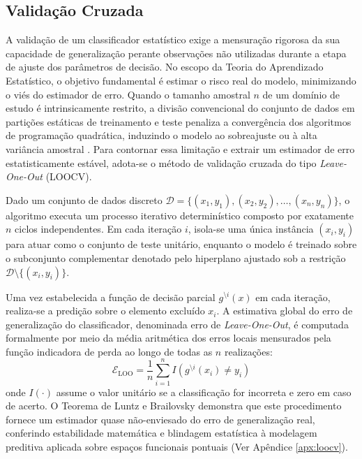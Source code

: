 \documentclass[12pt, a4paper]{article}
\theoremstyle{plain}
\theoremstyle{definition}
\theoremstyle{remark}
\newcommand{\ident}{\hspace{2em}}
\begin{document}
\subsection{Validação Cruzada}

\ident A validação de um classificador estatístico exige a mensuração rigorosa da sua capacidade de generalização perante observações não utilizadas durante a etapa de ajuste dos parâmetros de decisão. No escopo da Teoria do Aprendizado Estatístico, o objetivo fundamental é estimar o risco real do modelo, minimizando o viés do estimador de erro. Quando o tamanho amostral $n$ de um domínio de estudo é intrinsicamente restrito, a divisão convencional do conjunto de dados em partições estáticas de treinamento e teste penaliza a convergência dos algoritmos de programação quadrática, induzindo o modelo ao sobreajuste ou à alta variância amostral \cite{lorena2007}. Para contornar essa limitação e extrair um estimador de erro estatisticamente estável, adota-se o método de validação cruzada do tipo \textit{Leave-One-Out} (LOOCV).

\ident Dado um conjunto de dados discreto $\mathcal{D} = \{(x_1, y_1), (x_2, y_2), \dots, (x_n, y_n)\}$, o algoritmo executa um processo iterativo determinístico composto por exatamente $n$ ciclos independentes. Em cada iteração $i$, isola-se uma única instância $(x_i, y_i)$ para atuar como o conjunto de teste unitário, enquanto o modelo é treinado sobre o subconjunto complementar denotado pelo hiperplano ajustado sob a restrição $\mathcal{D} \setminus \{(x_i, y_i)\}$. 

\ident Uma vez estabelecida a função de decisão parcial $g^{\setminus i}(x)$ em cada iteração, realiza-se a predição sobre o elemento excluído $x_i$. A estimativa global do erro de generalização do classificador, denominada erro de \textit{Leave-One-Out}, é computada formalmente por meio da média aritmética dos erros locais mensurados pela função indicadora de perda ao longo de todas as $n$ realizações:
\begin{equation*}
    \mathcal{E}_{\text{LOO}} = \frac{1}{n} \sum_{i=1}^{n} I\left( g^{\setminus i}(x_i) \neq y_i \right)
\end{equation*}
onde $I(\cdot)$ assume o valor unitário se a classificação for incorreta e zero em caso de acerto. O Teorema de Luntz e Brailovsky demonstra que este procedimento fornece um estimador quase não-enviesado do erro de generalização real, conferindo estabilidade matemática e blindagem estatística à modelagem preditiva aplicada sobre espaços funcionais pontuais (Ver Apêndice \ref{apx:loocv}).
\end{document}
